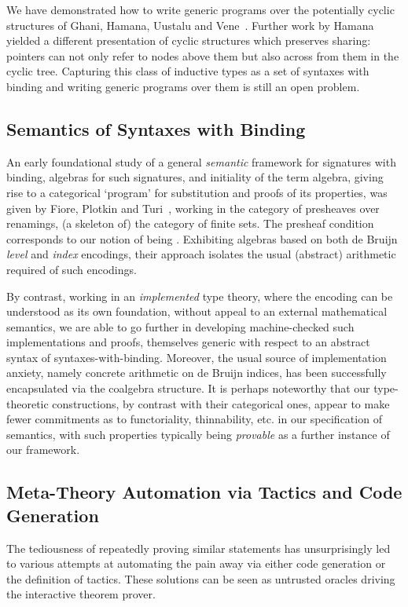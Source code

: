 {We have demonstrated how to write generic programs over the potentially
cyclic structures of Ghani, Hamana, Uustalu and Vene~\citeyear{ghani2006representing}.
Further work by Hamana~\citeyear{Hamana2009} yielded a different presentation
of cyclic structures which preserves sharing: pointers can not only refer
to nodes above them but also across from them in the cyclic tree. Capturing
this class of inductive types as a set of syntaxes with binding and writing
generic programs over them is still an open problem.

\subsection{Semantics of Syntaxes with Binding} An early foundational study
of a general \emph{semantic} framework for signatures with binding, algebras
for such signatures, and initiality of the term algebra, giving rise to a
categorical `program' for substitution and proofs of its properties, was given
by Fiore, Plotkin and Turi~\cite{FiorePlotkinTuri99}, working in the category of presheaves
over renamings, (a skeleton of) the category of finite sets. The presheaf
condition corresponds to our notion of being . Exhibiting
algebras based on both de Bruijn \emph{level} and \emph{index} encodings,
their approach isolates the usual (abstract) arithmetic required of such encodings.

By contrast, working in an \emph{implemented} type theory, where the encoding
can be understood as its own foundation, without appeal to an external mathematical
semantics, we are able to go further in developing machine-checked such
implementations and proofs, themselves generic with respect to an abstract syntax
 of syntaxes-with-binding. Moreover, the usual source of implementation
anxiety, namely concrete arithmetic on de Bruijn indices, has been successfully
encapsulated via the  coalgebra structure. It is perhaps noteworthy that
our type-theoretic constructions, by contrast with their categorical ones,
appear to make fewer commitments as to functoriality, thinnability, etc. in our
specification of semantics, with such properties typically being \emph{provable}
as a further instance of our framework.

\subsection{Meta-Theory Automation via Tactics and Code Generation} The
tediousness of repeatedly
proving similar statements has unsurprisingly led to various attempts at
automating the pain away via either code generation or the definition of
tactics. These solutions can be seen as untrusted oracles driving the
interactive theorem prover.

}
